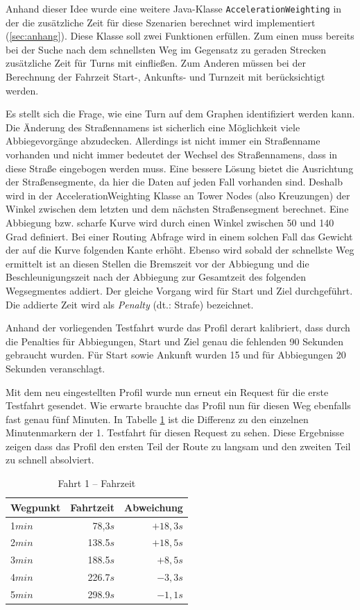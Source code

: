 Anhand dieser Idee wurde eine weitere Java-Klasse \texttt{AccelerationWeighting} in der die zusätzliche Zeit für diese Szenarien berechnet wird implementiert (\ref{sec:anhang}).
Diese Klasse soll zwei Funktionen erfüllen.
Zum einen muss bereits bei der Suche nach dem schnellsten Weg im Gegensatz zu geraden Strecken zusätzliche Zeit für Turns mit einfließen.
Zum Anderen müssen bei der Berechnung der Fahrzeit Start-, Ankunfts- und Turnzeit mit berücksichtigt werden.

Es stellt sich die Frage, wie eine Turn auf dem Graphen identifiziert werden kann.
Die Änderung des Straßennamens ist sicherlich eine Möglichkeit viele Abbiegevorgänge abzudecken.
Allerdings ist nicht immer ein Straßenname vorhanden und nicht immer bedeutet der Wechsel des Straßennamens, dass in diese Straße eingebogen werden muss.
Eine bessere Lösung bietet die Ausrichtung der Straßensegmente, da hier die Daten auf jeden Fall vorhanden sind.
Deshalb wird in der AccelerationWeighting Klasse an Tower Nodes (also Kreuzungen) der Winkel zwischen dem letzten und dem nächsten Straßensegment berechnet.
Eine Abbiegung bzw.
scharfe Kurve wird durch einen Winkel zwischen 50 und 140 Grad definiert.
Bei einer Routing Abfrage wird in einem solchen Fall das Gewicht der auf die Kurve folgenden Kante erhöht.
Ebenso wird sobald der schnellste Weg ermittelt ist an diesen Stellen die Bremszeit vor der Abbiegung und die Beschleunigungszeit nach der Abbiegung zur Gesamtzeit des folgenden Wegsegmentes addiert.
Der gleiche Vorgang wird für Start und Ziel durchgeführt.
Die addierte Zeit wird als \textit{Penalty} (dt.: Strafe) bezeichnet.

Anhand der vorliegenden Testfahrt wurde das Profil derart kalibriert, dass durch die Penalties für Abbiegungen, Start und Ziel genau die fehlenden 90 Sekunden gebraucht wurden.
Für Start sowie Ankunft wurden 15 und für Abbiegungen 20 Sekunden veranschlagt.

Mit dem neu eingestellten Profil wurde nun erneut ein Request für die erste Testfahrt gesendet.
Wie erwarte brauchte das Profil nun für diesen Weg ebenfalls fast genau fünf Minuten.
In Tabelle \ref{tab:drive11} ist die Differenz zu den einzelnen Minutenmarkern der 1. Testfahrt für diesen Request zu sehen.
Diese Ergebnisse zeigen dass das Profil den ersten Teil der Route zu langsam und den zweiten Teil zu schnell absolviert.

\begin{table}[h]
\centering
\caption{Fahrt 1 -- Fahrzeit}
\label{tab:drive11}
\begin{tabular}{|l|r|r|}
\hline
Wegpunkt & Fahrtzeit & Abweichung \\ \hline 
1$min$ & 78,3$s$ & $+18,3s$ \\
2$min$ & 138.5$s$ & $+18,5s$ \\
3$min$ & 188.5$s$ & $+8,5s$ \\
4$min$ & 226.7$s$ & $-3,3s$ \\
5$min$ & 298.9$s$ & $-1,1s$ \\
\hline
\end{tabular}
\end{table}

